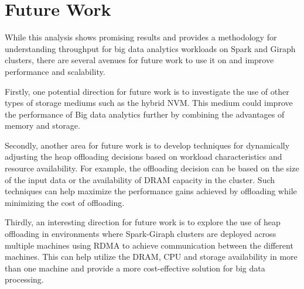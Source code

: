 \section{Future Work}

While this analysis shows promising results and provides a methodology for understanding
throughput for big data analytics workloads on Spark and Giraph
clusters, there are several avenues for future work to use it on and
improve performance and scalability. 

Firstly, one potential direction for future work is to investigate the
use of other types of storage mediums such as the hybrid NVM. This
medium could improve the performance of Big data analytics further by
combining the advantages of memory and storage.

Secondly, another area for future work is to develop techniques for
dynamically adjusting the heap offloading decisions based on workload
characteristics and resource availability. For example, the offloading
decision can be based on the size of the input data or the
availability of DRAM capacity in the cluster. Such techniques can help
maximize the performance gains achieved by offloading while minimizing
the cost of offloading.

Thirdly, an interesting direction for future work is to explore the
use of heap offloading in environments where Spark-Giraph clusters are
deployed across multiple machines using RDMA to achieve communication
between the different machines. This can help utilize the DRAM, CPU
and storage availability in more than one machine and provide a more
cost-effective solution for big data processing.

